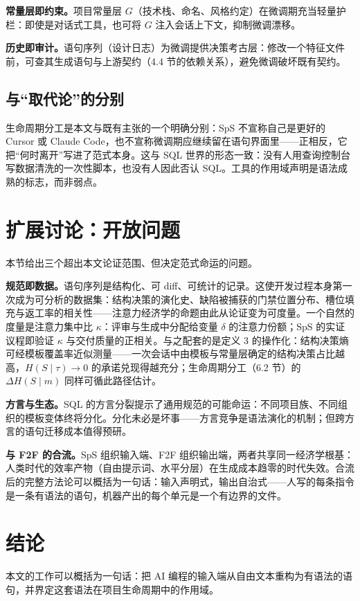 \documentclass[11pt,a4paper]{ctexart}
\begin{document}
\textbf{常量层即约束。}项目常量层 $G$（技术栈、命名、风格约定）在微调期充当轻量护栏：即使是对话式工具，也可将 $G$ 注入会话上下文，抑制微调漂移。

\textbf{历史即审计。}语句序列（设计日志）为微调提供决策考古层：修改一个特征文件前，可查其生成语句与上游契约（4.4 节的依赖关系），避免微调破坏既有契约。

\subsection{与“取代论”的分别}
生命周期分工是本文与既有主张的一个明确分别：SpS 不宣称自己是更好的 Cursor 或 Claude Code，也不宣称微调期应继续留在语句界面里——正相反，它把“何时离开”写进了范式本身。这与 SQL 世界的形态一致：没有人用查询控制台写数据清洗的一次性脚本，也没有人因此否认 SQL。工具的作用域声明是语法成熟的标志，而非弱点。

\section{扩展讨论：开放问题}
本节给出三个超出本文论证范围、但决定范式命运的问题。

\textbf{规范即数据。}语句序列是结构化、可 diff、可统计的记录。这使开发过程本身第一次成为可分析的数据集：结构决策的演化史、缺陷被捕获的门禁位置分布、槽位填充与返工率的相关性——注意力经济学的命题由此从论证变为可度量。一个自然的度量是注意力集中比 $\kappa$：评审与生成中分配给变量 $\delta$ 的注意力份额；SpS 的实证议程即验证 $\kappa$ 与交付质量的正相关。与之配套的是定义 3 的操作化：结构决策熵可经模板覆盖率近似测量——一次会话中由模板与常量层确定的结构决策占比越高，$H(S\mid\tau)\to 0$ 的承诺兑现得越充分；生命周期分工（6.2 节）的 $\Delta H(S\mid m)$ 同样可循此路径估计。

\textbf{方言与生态。}SQL 的方言分裂提示了通用规范的可能命运：不同项目族、不同组织的模板变体终将分化。分化未必是坏事——方言竞争是语法演化的机制；但跨方言的语句迁移成本值得预研。

\textbf{与 F2F 的合流。}SpS 组织输入端、F2F 组织输出端，两者共享同一经济学根基：人类时代的效率产物（自由提示词、水平分层）在生成成本趋零的时代失效。合流后的完整方法论可以概括为一句话：输入声明式，输出自治式——人写的每条指令是一条有语法的语句，机器产出的每个单元是一个有边界的文件。

\section{结论}
本文的工作可以概括为一句话：把 AI 编程的输入端从自由文本重构为有语法的语句，并界定这套语法在项目生命周期中的作用域。
\end{document}
